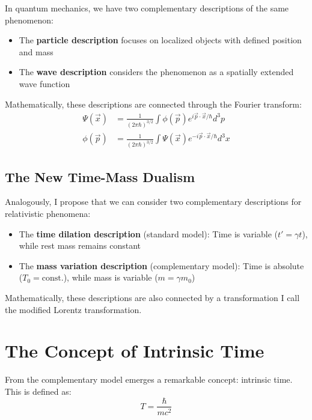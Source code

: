\documentclass[a4paper,12pt]{article}
\begin{document}
	In quantum mechanics, we have two complementary descriptions of the same phenomenon:
	
	\begin{itemize}
		\item The \textbf{particle description} focuses on localized objects with defined position and mass
		\item The \textbf{wave description} considers the phenomenon as a spatially extended wave function
	\end{itemize}
	
	Mathematically, these descriptions are connected through the Fourier transform:
	\begin{align}
		\Psi(\vec{x}) &= \frac{1}{(2\pi\hbar)^{3/2}} \int \phi(\vec{p}) e^{i\vec{p}\cdot\vec{x}/\hbar} d^3p \\
		\phi(\vec{p}) &= \frac{1}{(2\pi\hbar)^{3/2}} \int \Psi(\vec{x}) e^{-i\vec{p}\cdot\vec{x}/\hbar} d^3x
	\end{align}
	
	\subsection{The New Time-Mass Dualism}
	
	Analogously, I propose that we can consider two complementary descriptions for relativistic phenomena:
	
	\begin{itemize}
		\item The \textbf{time dilation description} (standard model): Time is variable ($t' = \gamma t$), while rest mass remains constant
		\item The \textbf{mass variation description} (complementary model): Time is absolute ($T_0 = \text{const.}$), while mass is variable ($m = \gamma m_0$)
	\end{itemize}
	
	Mathematically, these descriptions are also connected by a transformation I call the modified Lorentz transformation.
	
	\section{The Concept of Intrinsic Time}
	
	From the complementary model emerges a remarkable concept: intrinsic time. This is defined as:
	\begin{equation}
		T = \frac{\hbar}{mc^2}
	\end{equation}
	
\end{document}

